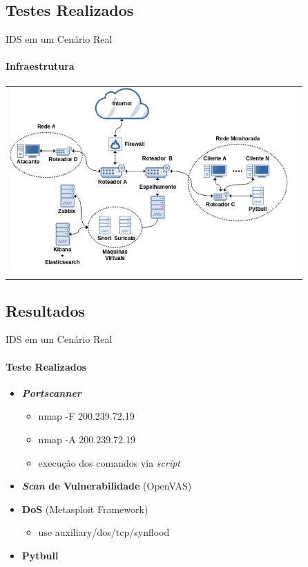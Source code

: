 \documentclass[aspectratio=169]{beamer}
\begin{document}
\subsection{Testes Realizados}
\begin{frame}{IDS em um Cenário Real}
    \framesubtitle{Infraestrutura}
    \begin{minipage}{\linewidth}
        \begin{tabular}{c}
            \includegraphics[width=11cm]{imagens/infra.png}
        \end{tabular}
    \end{minipage}
\end{frame}
\subsection{Resultados}
\begin{frame}{IDS em um Cenário Real}
    \framesubtitle{Teste Realizados}
    \begin{itemize}
        \item \textbf{\textit{Portscanner}}
        \begin{itemize}
            \item nmap -F 200.239.72.19
            \item nmap -A 200.239.72.19
            \item execução dos comandos via \textit{script}
        \end{itemize}
        \item \textbf{\textit{Scan} de Vulnerabilidade} (OpenVAS)
        \item \textbf{DoS} (Metasploit Framework)
            \begin{itemize}
                \item use auxiliary/dos/tcp/synflood
            \end{itemize}        
        \item \textbf{Pytbull}
    \end{itemize}
\end{frame}
\end{document}
